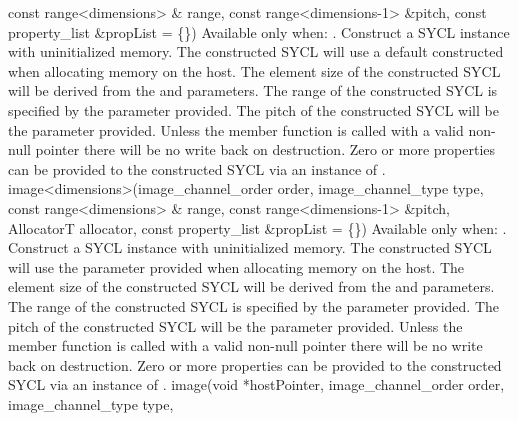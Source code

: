        { const range<dimensions> \& range, }
       { const range<dimensions-1> \&pitch, }
       { const property_list \&propList = \{\}) }
       {
          Available only when: .  
          \newline    
          Construct a SYCL  instance with uninitialized memory.
         The constructed SYCL  will use a default constructed  when allocating memory on the host.
         The element size of the constructed SYCL  will be derived from the  and  parameters.
         The range of the constructed SYCL  is specified by the  parameter provided.
         The pitch of the constructed SYCL  will be the  parameter provided.
         Unless the member function  is called with a valid non-null pointer there will be no write back on destruction.
         Zero or more properties can be provided to the constructed SYCL  via an instance of .
        }
     \addRowSixSL
       {image<dimensions>(image_channel_order order, }
       { image_channel_type type, }
       { const range<dimensions> \& range, }
       { const range<dimensions-1> \&pitch, }
       { AllocatorT allocator, }
       { const property_list \&propList = \{\}) }
       {
          Available only when: .  
          \newline    
          Construct a SYCL  instance with uninitialized memory.
         The constructed SYCL  will use the  parameter provided when allocating memory on the host.
         The element size of the constructed SYCL  will be derived from the  and  parameters.
         The range of the constructed SYCL  is specified by the  parameter provided.
         The pitch of the constructed SYCL  will be the  parameter provided.
         Unless the member function  is called with a valid non-null pointer there will be no write back on destruction.
         Zero or more properties can be provided to the constructed SYCL  via an instance of .
       }
    \addRowFiveSL
      {image(void *hostPointer, }
      { image_channel_order order, }
      { image_channel_type type, }
